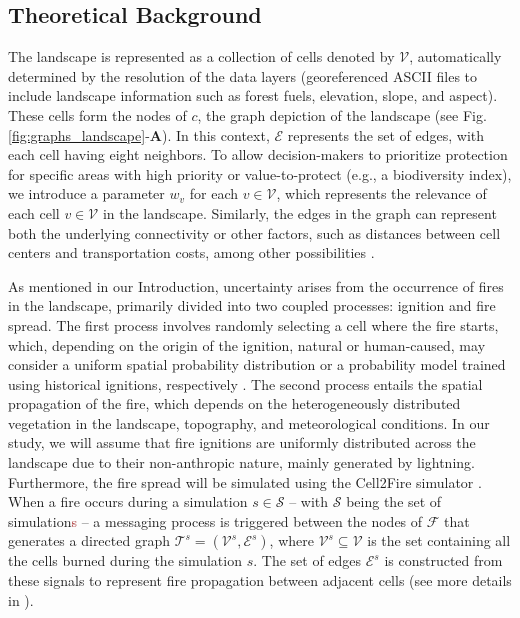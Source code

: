\documentclass[a4paper,fleqn]{cas-sc}
\begin{document}
\subsection{Theoretical Background}
The landscape is represented as a collection of cells denoted by $\mathcal{V}$, automatically determined by the resolution of the data layers (georeferenced ASCII files to include landscape information such as forest fuels, elevation, slope, and aspect). These cells form the nodes of $c$, the graph depiction of the landscape (see Fig.\:\ref{fig:graphs_landscape}-\textbf{A}). In this context, $\mathcal{E}$ represents the set of edges, with each cell having eight neighbors. To allow decision-makers to prioritize protection for specific areas with high priority or value-to-protect (e.g., a biodiversity index), we introduce a parameter $w_v$ for each $v \in \mathcal{V}$, which represents the relevance of each cell $v \in \mathcal{V}$ in the landscape. Similarly, the edges in the graph can represent both the underlying connectivity or other factors, such as distances between cell centers and transportation costs, among other possibilities \citep{carrasco2023firebreak}.

As mentioned in our Introduction, uncertainty arises from the occurrence of fires in the landscape, primarily divided into two coupled processes: ignition and fire spread. The first process involves randomly selecting a cell where the fire starts, which, depending on the origin of the ignition, natural or human-caused, may consider a uniform spatial probability distribution or a probability model trained using historical ignitions, respectively \citep{carrasco2021exploring}. The second process entails the spatial propagation of the fire, which depends on the heterogeneously distributed vegetation in the landscape, topography, and meteorological conditions. In our study, we will assume that fire ignitions are uniformly distributed across the landscape due to their non-anthropic nature, mainly generated by lightning. Furthermore, the fire spread will be simulated using the Cell2Fire simulator \citep{pais2021cell2fire}. When a fire occurs during a simulation $s \in \mathcal{S}$ -- with $\mathcal{S}$ being the set of simulation\textcolor{brown}{s} -- a messaging process is triggered between the nodes of $\mathcal{F}$ that generates a directed graph $\mathcal{T}^s = (\mathcal{V}^s, \mathcal{E}^s)$, where $\mathcal{V}^s \subseteq \mathcal{V}$ is the set containing all the cells burned during the simulation $s$. The set of edges $\mathcal{E}^s$ is constructed from these signals to represent fire propagation between adjacent cells (see more details in \cite{pais2021downstream}).
\end{document}
